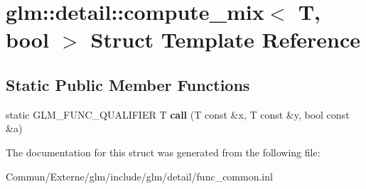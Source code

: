 \hypertarget{structglm_1_1detail_1_1compute__mix_3_01_t_00_01bool_01_4}{}\section{glm\+:\+:detail\+:\+:compute\+\_\+mix$<$ T, bool $>$ Struct Template Reference}
\label{structglm_1_1detail_1_1compute__mix_3_01_t_00_01bool_01_4}
\subsection*{Static Public Member Functions}
\begin{DoxyCompactItemize}
\item 
static G\+L\+M\+\_\+\+F\+U\+N\+C\+\_\+\+Q\+U\+A\+L\+I\+F\+I\+ER T {\bfseries call} (T const \&x, T const \&y, bool const \&a)\hypertarget{structglm_1_1detail_1_1compute__mix_3_01_t_00_01bool_01_4_a7a83cf7bd102239b974faf18137d8c63}{}\label{structglm_1_1detail_1_1compute__mix_3_01_t_00_01bool_01_4_a7a83cf7bd102239b974faf18137d8c63}

\end{DoxyCompactItemize}


The documentation for this struct was generated from the following file\+:\begin{DoxyCompactItemize}
\item 
Commun/\+Externe/glm/include/glm/detail/func\+\_\+common.\+inl\end{DoxyCompactItemize}
